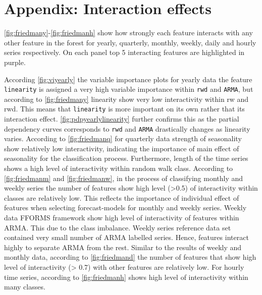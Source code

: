 \documentclass[11pt,a4paper,]{article}
\begin{document}
\hypertarget{appendix-interaction-effects}{%
\section*{Appendix: Interaction effects}\label{appendix-interaction-effects}}

\autoref{fig:friedmany}-\autoref{fig:friedmanh} show how strongly each feature interacts with any other feature in the forest for yearly, quarterly, monthly, weekly, daily and hourly series respectively. On each panel top 5 interacting features are highlighted in purple.

According \autoref{fig:viyearly} the variable importance plots for yearly data the feature \texttt{linearity} is assigned a very high variable importance within \texttt{rwd} and \texttt{ARMA}, but according to \autoref{fig:friedmany} linearity show very low interactivity within rw and rwd. This means that \texttt{linearity} is more important on its own rather that its interaction effect. \autoref{fig:pdpyearlylinearity} further confirms this as the partial dependency curves corresponds to \texttt{rwd} and \texttt{ARMA} drastically changes as linearity varies. According to \autoref{fig:friedmanq} for quarterly data strength of seasonality show relatively low interactivity, indicating the importance of main effect of seasonality for the classification process. Furthermore, length of the time series shows a high level of interactivity within random walk class. According to \autoref{fig:friedmanm} and \autoref{fig:friedmanw}, in the process of classifying monthly and weekly series the number of features show high level (\textgreater{}0.5) of interactivity within classes are relatively low. This reflects the importance of individual effect of features when selecting forecast-models for monthly and weekly series. Weekly data FFORMS framework show high level of interactivity of features within ARMA. This due to the class imbalance. Weekly series reference data set contained very small number of ARMA labelled series. Hence, features interact highly to separate ARMA from the rest. Similar to the results of weekly and monthly data, according to \autoref{fig:friedmand} the number of features that show high level of interactivity (\textgreater{} 0.7) with other features are relatively low. For hourly time series, according to \autoref{fig:friedmanh} shows high level of interactivity within many classes.
\end{document}
